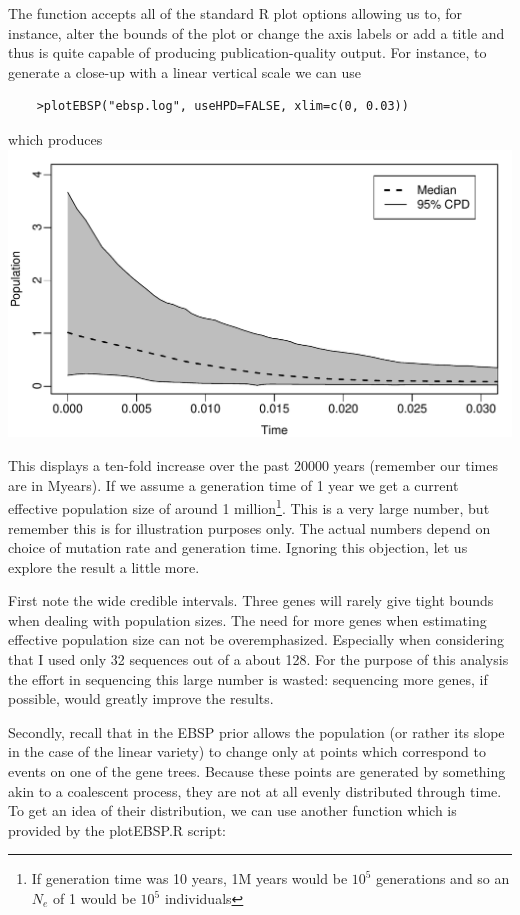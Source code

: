 \documentclass[a4paper,11pt]{article}
\begin{document}
The function accepts all of the standard R plot options allowing us to, for
instance, alter the bounds of the plot or change the axis labels or add a title
and thus is quite capable of producing publication-quality output.  For
instance, to generate a close-up with a linear vertical scale we can use

\begin{verbatim}
    >plotEBSP("ebsp.log", useHPD=FALSE, xlim=c(0, 0.03))
\end{verbatim}

which produces\\
\includegraphics[width=\textwidth]{figures/mystery2.pdf}

This displays a ten-fold increase over the past 20000 years (remember our times
are in Myears). If we assume a generation time of 1 year we get a current
effective population size of around 1 million\footnote{If generation time was
    10 years, 1M years would be $10^5$ generations and so an $N_e$ of 1 would
    be $10^5$ individuals}. This is a very large number, but remember this is
for illustration purposes only. The actual numbers depend on choice of mutation
rate and generation time. Ignoring this objection, let us explore the result a
little more.

First note the wide credible intervals. Three genes will rarely give tight
bounds when dealing with population sizes. The need for more genes when
estimating effective population size can not be overemphasized. Especially when
considering that I used only 32 sequences out of a about 128. For the purpose
of this analysis the effort in sequencing this large number is wasted:
sequencing more genes, if possible, would greatly improve the results.

Secondly, recall that in the EBSP prior allows the population (or rather its
slope in the case of the linear variety) to change only at points which
correspond to events on one of the gene trees.  Because these points are
generated by something akin to a coalescent process, they are not at all evenly
distributed through time.  To get an idea of their distribution, we can use
another function which is provided by the plotEBSP.R script:
\end{document}
